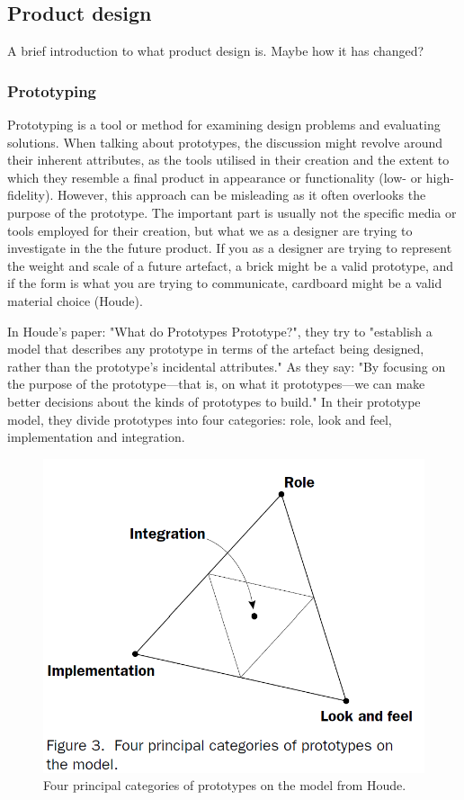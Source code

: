 \subsection{Product design}
A brief introduction to what product design is. Maybe how it has changed?

\subsubsection{Prototyping}
Prototyping is a tool or method for examining design problems and evaluating solutions. When talking about prototypes, the discussion might revolve around their inherent attributes, as the tools utilised in their creation and the extent to which they resemble a final product in appearance or functionality (low- or high-fidelity). However, this approach can be misleading as it often overlooks the purpose of the prototype. The important part is usually not the specific media or tools employed for their creation, but what we as a designer are trying to investigate in the 
the future product. If you as a designer are trying to represent the weight and scale of a future artefact, a brick might be a valid prototype, and if the form is what you are trying to communicate, cardboard might be a valid material choice (Houde).

In Houde's paper: "What do Prototypes Prototype?", they try to "establish a model that describes any prototype in terms of the artefact being designed, rather than the prototype’s incidental attributes." As they say: "By focusing on the purpose of the prototype—that is, on what it prototypes—we can make better decisions about the kinds of prototypes to build."
In their prototype model, they divide prototypes into four categories: role, look and feel, implementation and integration.
\begin{figure}
    \centering
    \includegraphics[width=0.5\linewidth]{prototype-model.png}
    \caption{Four principal categories of prototypes on the model from Houde.}
    \label{fig:prototype-model}
\end{figure}

